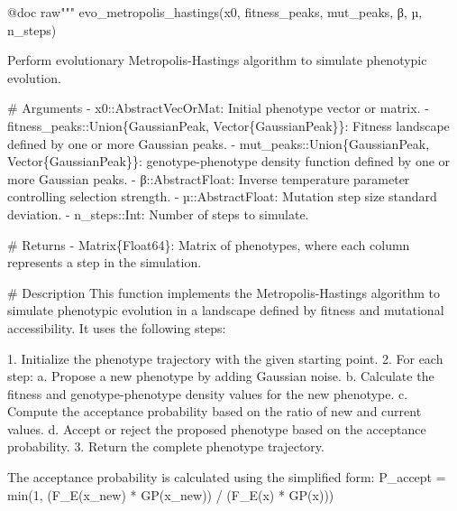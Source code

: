 \documentclass[
]{scrartcl}
\newenvironment{Shaded}{\begin{snugshade}}{\end{snugshade}}
\newcommand{\PreprocessorTok}[1]{\textcolor[rgb]{0.68,0.00,0.00}{#1}}
\newcommand{\StringTok}[1]{\textcolor[rgb]{0.13,0.47,0.30}{#1}}
\begin{document}
\begin{Shaded}
\begin{Highlighting}[]
\PreprocessorTok{@doc} \StringTok{raw"""}
\StringTok{    evo\_metropolis\_hastings(x0, fitness\_peaks, mut\_peaks, β, µ, n\_steps)}

\StringTok{Perform evolutionary Metropolis{-}Hastings algorithm to simulate phenotypic}
\StringTok{evolution.}

\StringTok{\# Arguments}
\StringTok{{-} \textasciigrave{}x0::AbstractVecOrMat\textasciigrave{}: Initial phenotype vector or matrix.}
\StringTok{{-} \textasciigrave{}fitness\_peaks::Union\{GaussianPeak, Vector\{GaussianPeak\}\}\textasciigrave{}: Fitness landscape}
\StringTok{  defined by one or more Gaussian peaks.}
\StringTok{{-} \textasciigrave{}mut\_peaks::Union\{GaussianPeak, Vector\{GaussianPeak\}\}\textasciigrave{}: genotype{-}phenotype}
\StringTok{  density function defined by one or more Gaussian peaks.}
\StringTok{{-} \textasciigrave{}β::AbstractFloat\textasciigrave{}: Inverse temperature parameter controlling selection}
\StringTok{  strength.}
\StringTok{{-} \textasciigrave{}µ::AbstractFloat\textasciigrave{}: Mutation step size standard deviation.}
\StringTok{{-} \textasciigrave{}n\_steps::Int\textasciigrave{}: Number of steps to simulate.}

\StringTok{\# Returns}
\StringTok{{-} \textasciigrave{}Matrix\{Float64\}\textasciigrave{}: Matrix of phenotypes, where each column represents a step}
\StringTok{  in the simulation.}

\StringTok{\# Description}
\StringTok{This function implements the Metropolis{-}Hastings algorithm to simulate}
\StringTok{phenotypic evolution in a landscape defined by fitness and mutational}
\StringTok{accessibility. It uses the following steps:}

\StringTok{1. Initialize the phenotype trajectory with the given starting point.}
\StringTok{2. For each step: }
\StringTok{   a. Propose a new phenotype by adding Gaussian noise. }
\StringTok{   b. Calculate the fitness and genotype{-}phenotype density values for the new }
\StringTok{      phenotype.}
\StringTok{   c. Compute the acceptance probability based on the ratio of new and current }
\StringTok{      values. }
\StringTok{   d. Accept or reject the proposed phenotype based on the acceptance }
\StringTok{      probability.}
\StringTok{3. Return the complete phenotype trajectory.}

\StringTok{The acceptance probability is calculated using the simplified form: }
\StringTok{P\_accept = min(1, (F\_E(x\_new) * GP(x\_new)) / (F\_E(x) * GP(x)))}


\end{Highlighting}
\end{Shaded}
\end{document}
